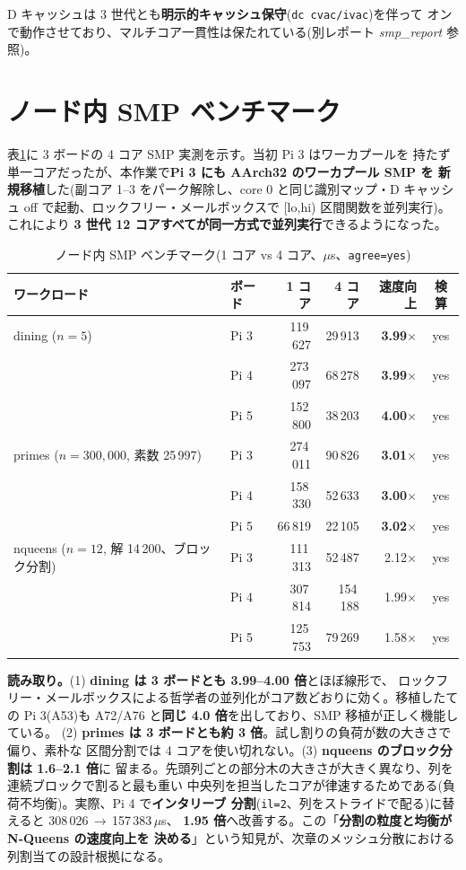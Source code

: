 \documentclass[11pt,a4paper]{article}
\newcommand{\code}[1]{\texttt{#1}}
\begin{document}
\noindent
D キャッシュは 3 世代とも\textbf{明示的キャッシュ保守}(\code{dc cvac/ivac})を伴って
オンで動作させており、マルチコア一貫性は保たれている(別レポート
\emph{smp\_report} 参照)。

\section{ノード内 SMP ベンチマーク}
表\ref{tab:smp}に 3 ボードの 4 コア SMP 実測を示す。当初 Pi 3 はワーカプールを
持たず単一コアだったが、本作業で\textbf{Pi 3 にも AArch32 のワーカプール SMP を
新規移植}した(副コア 1--3 をパーク解除し、core 0 と同じ識別マップ・D キャッシュ off
で起動、ロックフリー・メールボックスで [lo,hi) 区間関数を並列実行)。これにより
\textbf{3 世代 12 コアすべてが同一方式で並列実行}できるようになった。

\begin{table}[h]\centering
\caption{ノード内 SMP ベンチマーク(1 コア vs 4 コア、$\mu$s、\code{agree=yes})}\label{tab:smp}
\small
\begin{tabular}{llrrrc}
\toprule
ワークロード & ボード & 1 コア & 4 コア & 速度向上 & 検算 \\
\midrule
dining ($n{=}5$)
  & Pi 3 & 119\,627 & 29\,913 & \textbf{3.99$\times$} & yes \\
  & Pi 4 & 273\,097 & 68\,278 & \textbf{3.99$\times$} & yes \\
  & Pi 5 & 152\,800 & 38\,203 & \textbf{4.00$\times$} & yes \\
\addlinespace
primes ($n{=}300{,}000$, 素数 25\,997)
  & Pi 3 & 274\,011 & 90\,826 & \textbf{3.01$\times$} & yes \\
  & Pi 4 & 158\,330 & 52\,633 & \textbf{3.00$\times$} & yes \\
  & Pi 5 &  66\,819 & 22\,105 & \textbf{3.02$\times$} & yes \\
\addlinespace
nqueens ($n{=}12$, 解 14\,200、ブロック分割)
  & Pi 3 & 111\,313 &  52\,487 & 2.12$\times$ & yes \\
  & Pi 4 & 307\,814 & 154\,188 & 1.99$\times$ & yes \\
  & Pi 5 & 125\,753 &  79\,269 & 1.58$\times$ & yes \\
\bottomrule
\end{tabular}
\end{table}

\noindent
\textbf{読み取り。}(1) \textbf{dining は 3 ボードとも 3.99--4.00 倍}とほぼ線形で、
ロックフリー・メールボックスによる哲学者の並列化がコア数どおりに効く。移植したての
Pi 3(A53)も A72/A76 と\textbf{同じ 4.0 倍}を出しており、SMP 移植が正しく機能している。
(2) \textbf{primes は 3 ボードとも約 3 倍}。試し割りの負荷が数の大きさで偏り、素朴な
区間分割では 4 コアを使い切れない。(3) \textbf{nqueens のブロック分割は 1.6--2.1 倍}に
留まる。先頭列ごとの部分木の大きさが大きく異なり、列を連続ブロックで割ると最も重い
中央列を担当したコアが律速するためである(負荷不均衡)。実際、Pi 4 で\textbf{インタリーブ
分割}(\code{il=2}、列をストライドで配る)に替えると 308\,026\,$\to$\,157\,383\,$\mu$s、
\textbf{1.95 倍}へ改善する。この「\textbf{分割の粒度と均衡が N‑Queens の速度向上を
決める}」という知見が、次章のメッシュ分散における列割当ての設計根拠になる。
\end{document}
